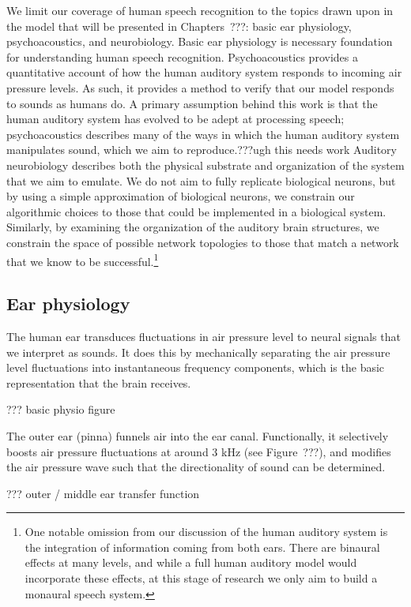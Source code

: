 We limit our coverage
of human speech recognition
to the topics drawn upon
in the model that will be presented
in Chapters~???:
basic ear physiology,
psychoacoustics,
and neurobiology.
Basic ear physiology is necessary
foundation for understanding
human speech recognition.
Psychoacoustics provides a quantitative account
of how the human auditory system
responds to incoming air pressure levels.
As such, it provides a method to verify
that our model responds to sounds
as humans do.
A primary assumption behind this work
is that the human auditory system
has evolved to be adept at processing speech;
psychoacoustics describes many of the ways
in which the human auditory system
manipulates sound,
which we aim to reproduce.???ugh this needs work
Auditory neurobiology describes both
the physical substrate and organization
of the system that we aim to emulate.
We do not aim to fully replicate
biological neurons,
but by using a simple approximation
of biological neurons,
we constrain our algorithmic choices
to those that could be implemented
in a biological system.
Similarly, by examining the organization
of the auditory brain structures,
we constrain the space of possible
network topologies
to those that match
a network that we know
to be successful.\footnote{One notable omission
  from our discussion
  of the human auditory system
  is the integration of information
  coming from both ears.
  There are binaural effects at many levels,
  and while a full human auditory model
  would incorporate these effects,
  at this stage of research
  we only aim to build
  a monaural speech system.}

\subsection{Ear physiology}

The human ear transduces fluctuations in
air pressure level to neural signals
that we interpret as sounds.
It does this by mechanically
separating the air pressure level fluctuations
into instantaneous frequency components,
which is the basic representation
that the brain receives.

??? basic physio figure

The outer ear (pinna) funnels air
into the ear canal.
Functionally, it selectively boosts
air pressure fluctuations at
around 3 kHz (see Figure~???),
and modifies the air pressure wave
such that the directionality
of sound can be determined.

??? outer / middle ear transfer function

